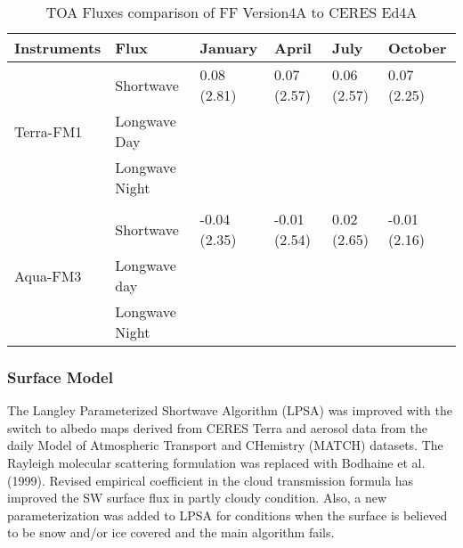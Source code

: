 \documentclass[12pt]{article}
\begin{document}
\begin{table}[h]
\begin{tabular}{llllll}
\hline
\multicolumn{1}{|l|}{Instruments} & \multicolumn{1}{l|}{Flux}           & \multicolumn{1}{l|}{January}      & \multicolumn{1}{l|}{April}        & \multicolumn{1}{l|}{July}        & \multicolumn{1}{l|}{October}      \\ \hline
\multicolumn{1}{l|}{}             & \multicolumn{1}{l|}{Shortwave}      & \multicolumn{1}{l|}{0.08 (2.81)}  & \multicolumn{1}{l|}{0.07 (2.57)}  & \multicolumn{1}{l|}{0.06 (2.57)} & \multicolumn{1}{l|}{0.07 (2.25)}  \\ \cline{2-6} 
\multicolumn{1}{l|}{Terra-FM1}    & \multicolumn{1}{l|}{Longwave Day}   & \multicolumn{1}{l|}{}             & \multicolumn{1}{l|}{}             & \multicolumn{1}{l|}{}            & \multicolumn{1}{l|}{}             \\ \cline{2-6} 
\multicolumn{1}{l|}{}             & \multicolumn{1}{l|}{Longwave Night} & \multicolumn{1}{l|}{}             & \multicolumn{1}{l|}{}             & \multicolumn{1}{l|}{}            & \multicolumn{1}{l|}{}             \\ \cline{2-6} 
                                  &                                     &                                   &                                   &                                  &                                   \\ \cline{2-6} 
\multicolumn{1}{l|}{}             & \multicolumn{1}{l|}{Shortwave}      & \multicolumn{1}{l|}{-0.04 (2.35)} & \multicolumn{1}{l|}{-0.01 (2.54)} & \multicolumn{1}{l|}{0.02 (2.65)} & \multicolumn{1}{l|}{-0.01 (2.16)} \\ \cline{2-6} 
\multicolumn{1}{l|}{Aqua-FM3}     & \multicolumn{1}{l|}{Longwave day}   & \multicolumn{1}{l|}{}             & \multicolumn{1}{l|}{}             & \multicolumn{1}{l|}{}            & \multicolumn{1}{l|}{}             \\ \cline{2-6} 
\multicolumn{1}{l|}{}             & \multicolumn{1}{l|}{Longwave Night} & \multicolumn{1}{l|}{}             & \multicolumn{1}{l|}{}             & \multicolumn{1}{l|}{}            & \multicolumn{1}{l|}{}             \\ \cline{2-6} 
\end{tabular}
\caption{TOA Fluxes comparison of FF Version4A to CERES Ed4A}
\label{tab:ta}
\end{table}


\subsubsection{Surface Model}
The Langley Parameterized Shortwave Algorithm (LPSA) was improved with the switch to albedo maps derived from CERES Terra and aerosol data from the daily Model of Atmospheric Transport and CHemistry (MATCH) datasets. The Rayleigh molecular scattering formulation was replaced with Bodhaine et al. (1999).  Revised empirical coefficient in the cloud transmission formula has improved the SW surface flux in partly cloudy condition.  Also, a new parameterization was added to LPSA for conditions when the surface is believed to be snow and/or ice covered and the main algorithm fails.  
\end{document}
